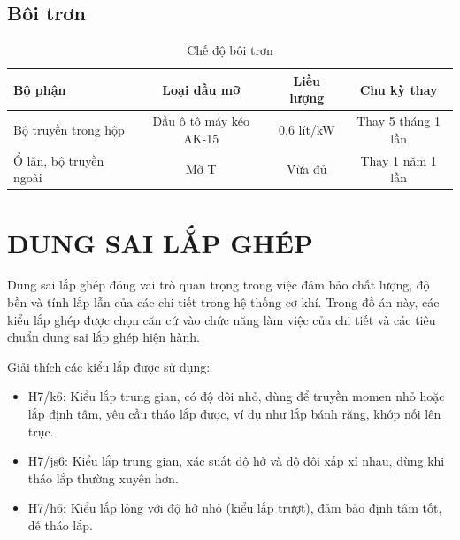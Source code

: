 \documentclass[12pt,a4paper]{report}
\begin{document}
\section{Bôi trơn}
\begin{table}[H]
    \centering
    \caption{Chế độ bôi trơn}
    \label{tab:5.10}
    \begin{tabular}{|l|c|c|c|}
        \hline
        \textbf{Bộ phận} & \textbf{Loại dầu mỡ} & \textbf{Liều lượng} & \textbf{Chu kỳ thay} \\
        \hline
        Bộ truyền trong hộp & Dầu ô tô máy kéo AK-15 & 0,6 lít/kW & Thay 5 tháng 1 lần \\
        Ổ lăn, bộ truyền ngoài & Mỡ T & Vừa đủ & Thay 1 năm 1 lần \\
        \hline
    \end{tabular}
\end{table}

\chapter{DUNG SAI LẮP GHÉP}

Dung sai lắp ghép đóng vai trò quan trọng trong việc đảm bảo chất lượng, độ bền và tính lắp lẫn của các chi tiết trong hệ thống cơ khí. Trong đồ án này, các kiểu lắp ghép được chọn căn cứ vào chức năng làm việc của chi tiết và các tiêu chuẩn dung sai lắp ghép hiện hành. 

Giải thích các kiểu lắp được sử dụng:
\begin{itemize}
    \item H7/k6: Kiểu lắp trung gian, có độ dôi nhỏ, dùng để truyền momen nhỏ hoặc lắp định tâm, yêu cầu tháo lắp được, ví dụ như lắp bánh răng, khớp nối lên trục.
    \item H7/js6: Kiểu lắp trung gian, xác suất độ hở và độ dôi xấp xỉ nhau, dùng khi tháo lắp thường xuyên hơn.
    \item H7/h6: Kiểu lắp lỏng với độ hở nhỏ (kiểu lắp trượt), đảm bảo định tâm tốt, dễ tháo lắp.
\end{itemize}
\end{document}
